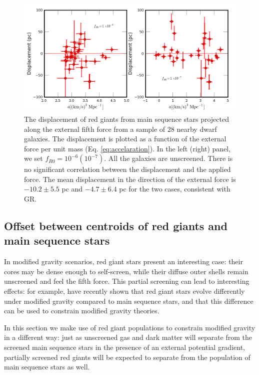 \documentclass[twocolappendix, numberedappendix]{emulateapj}
\begin{document}
\begin{figure}
\begin{center}
\includegraphics[scale=0.5]{figures/dispprojforce.png}
  \caption{The displacement of red giants from main sequence stars projected along 
the external fifth force from a sample of 28 nearby dwarf galaxies. The displacement is plotted as a function of the external force per unit mass
(Eq. \ref{eq:accelaration}). 
In the left (right) panel, we set $f_{R0}=10^{-6} (10^{-7})$. 
All the galaxies are unscreened. There is no significant correlation between
the
displacement and the applied force.
 The mean displacement in the direction of the 
external force is $-10.2\pm5.5$ pc  and $-4.7\pm6.4$ pc for
the two cases, consistent with GR. 
\label{fig:rgdispprojforce}}
\end{center}
\end{figure}


\subsection{Offset between centroids of red giants and main sequence stars}
\label{sec:rgb}
In modified gravity scenarios, red giant stars present an interesting case:
their cores may be dense enough to self-screen, while their diffuse outer
shells remain unscreened and feel the fifth force.  This partial screening
can lead to interesting effects: for example, 
\citet{changhui} have recently shown that red giant stars evolve differently
under modified gravity compared to main sequence stars, and that this
difference can be used to constrain modified gravity theories.

In this section we make use of red giant populations
to constrain modified gravity in a different way:
just as unscreened gas and dark matter will separate from
the screened main sequence stars in the presence
of an external potential gradient, partially screened red giants
will be expected to separate from the population
of main sequence stars as well.
\end{document}
